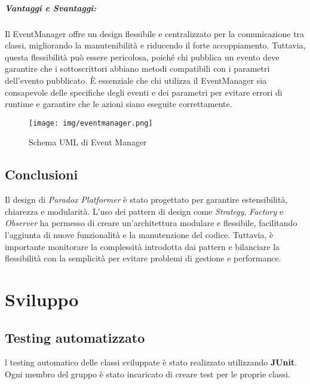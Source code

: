 \documentclass[a4paper,12pt]{report}
\begin{document}
	\paragraph{Vantaggi e Svantaggi:}
	Il EventManager offre un design flessibile e centralizzato per la comunicazione tra classi, migliorando la manutenibilità e riducendo il forte accoppiamento. Tuttavia, questa flessibilità può essere pericolosa, poiché chi pubblica un evento deve garantire che i sottoscrittori abbiano metodi compatibili con i parametri dell’evento pubblicato. È essenziale che chi utilizza il EventManager sia consapevole delle specifiche degli eventi e dei parametri per evitare errori di runtime e garantire che le azioni siano eseguite correttamente.
	
	\begin{figure}[H]
		\centering
		\texttt{[image: img/eventmanager.png]}
		\caption{Schema UML di Event Manager}
		\label{img:eventmanager}
	\end{figure}
	
	\section{Conclusioni}
	
	Il design di \textit{Paradox Platformer} è stato progettato per garantire estensibilità, chiarezza e modularità. L'uso dei pattern di design come \textit{Strategy}, \textit{Factory} e \textit{Observer} ha permesso di creare un'architettura modulare e flessibile, facilitando l'aggiunta di nuove funzionalità e la manutenzione del codice. Tuttavia, è importante monitorare la complessità introdotta dai pattern e bilanciare la flessibilità con la semplicità per evitare problemi di gestione e performance.
	
	
	\chapter{Sviluppo}
	\section{Testing automatizzato}
	
	l testing automatico delle classi sviluppate è stato realizzato utilizzando \textbf{JUnit}. Ogni membro del gruppo è stato incaricato di creare test per le proprie classi.
	
\end{document}
